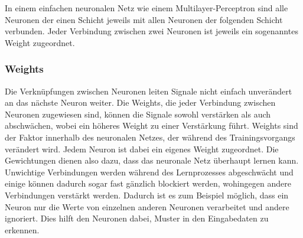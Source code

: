 In einem einfachen neuronalen Netz wie einem Multilayer-Perceptron sind alle Neuronen der einen Schicht jeweils mit allen Neuronen der folgenden Schicht verbunden.
Jeder Verbindung zwischen zwei Neuronen ist jeweils ein sogenanntes Weight zugeordnet. \cite{CA18}


\subsubsection{Weights}\label{subsec:neuronen:verknuepfung_neuronen:Weights}
  Die Verknüpfungen zwischen Neuronen leiten Signale nicht einfach unverändert an das nächste Neuron weiter.
  Die Weights, die jeder Verbindung zwischen Neuronen zugewiesen sind, können die Signale sowohl verstärken als auch abschwächen, wobei ein höheres Weight zu einer Verstärkung führt.
  Weights sind der Faktor innerhalb des neuronalen Netzes, der während des Trainingsvorgangs verändert wird.
  Jedem Neuron ist dabei ein eigenes Weight zugeordnet. Die Gewichtungen dienen also dazu, dass das neuronale Netz überhaupt lernen kann.
  Unwichtige Verbindungen werden während des Lernprozesses abgeschwächt und einige können dadurch sogar fast gänzlich blockiert werden, wohingegen andere Verbindungen verstärkt werden.
  Dadurch ist es zum Beispiel möglich, dass ein Neuron nur die Werte von einzelnen anderen Neuronen verarbeitet und andere ignoriert.
  Dies hilft den Neuronen dabei, Muster in den Eingabedaten zu erkennen. \cite{TR17} \cite{CA18}